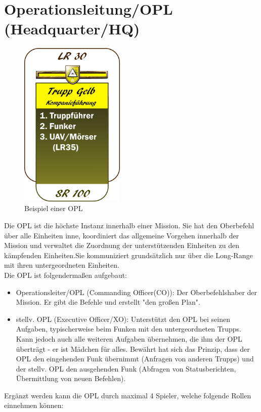 \section{Operationsleitung/OPL (Headquarter/HQ)}
\begin{figure}[htbp]
	\includegraphics[width=50mm]{./img/truppenordnung/opl/opl.png}
	\caption{Beispiel einer OPL}
\end{figure}
Die OPL ist die höchste Instanz innerhalb einer Mission. Sie hat den Oberbefehl über alle Einheiten inne, koordiniert das allgemeine Vorgehen innerhalb der Mission und verwaltet die Zuordnung der unterstützenden Einheiten zu den kämpfenden Einheiten.Sie kommuniziert grundsätzlich nur über die Long-Range mit ihren untergeordneten Einheiten.\\
Die OPL ist folgendermaßen aufgebaut:
\begin{itemize}
	\item Operationsleiter/OPL (Commanding Officer(CO)): Der Oberbefehlshaber der Mission. Er gibt die Befehle und erstellt "den großen Plan".
	\item stellv. OPL (Executive Officer/XO): Unterstützt den OPL bei seinen Aufgaben, typischerweise beim Funken mit den untergeordneten Trupps. Kann jedoch auch alle weiteren Aufgaben übernehmen, die ihm der OPL überträgt - er ist Mädchen für alles. Bewährt hat sich das Prinzip, dass der OPL den eingehenden Funk übernimmt (Anfragen von anderen Trupps) und der stellv. OPL den ausgehenden Funk (Abfragen von Statusberichten, Übermittlung von neuen Befehlen).
\end{itemize}
Ergänzt werden kann die OPL durch maximal 4 Spieler, welche folgende Rollen einnehmen können:
